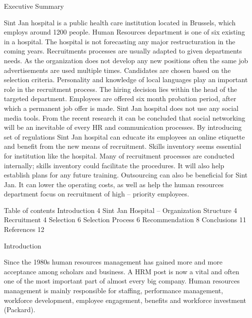 \documentclass[a4paper,fleqn,11pt,dvips,titlepage]{article}
\numberwithin{figure}{section}
\numberwithin{equation}{section}
\begin{document}

\author{}
\date{}
\title{}

\maketitle
\tableofcontents
\newpage

Executive Summary

Sint Jan hospital is a public health care institution located in Brussels, which employs around 1200 people. Human Resources department is one of six existing in a hospital.
The hospital is not forecasting any major restructuration in the coming years. Recruitments processes are usually adapted to given departments needs. As the organization does not develop any new positions often the same job advertisements are used multiple times.
Candidates are chosen based on the selection criteria. Personality and knowledge of local languages play an important role in the recruitment process. The hiring decision lies within the head of the targeted department. Employees are offered six month probation period, after which a permanent job offer is made.
Sint Jan hospital does not use any social media tools. From the recent research it can be concluded that social networking will be an inevitable of every HR and communication processes. By introducing set of regulations Sint Jan hospital can educate its employees an online etiquette and benefit from the new means of recruitment.
Skills inventory seems essential for institution like the hospital. Many of recruitment processes are conducted internally; skills inventory could facilitate the procedures. It will also help establish plans for any future training. 
Outsourcing can also be beneficial for Sint Jan. It can lower the operating costs, as well as help the human resources department focus on recruitment of high – priority employees. 


Table of contents
Introduction	4
Sint Jan Hospital – Organization Structure	4
Recruitment 	4
Selection	6
Selection Process	6
Recommendation	8
Conclusions	11
References	12





Introduction

Since the 1980s human resources management has gained more and more acceptance among scholars and business. A HRM post is now a vital and often one of the most important part of almost every big company. Human resources management is mainly responsible for staffing, performance management, workforce development, employee engagement, benefits and workforce investment (Packard). 
\end{document}
